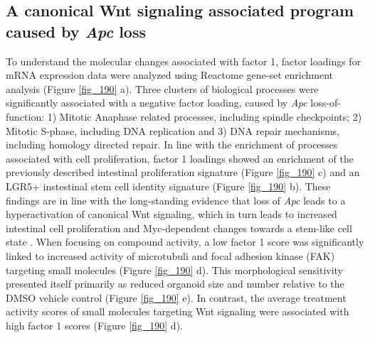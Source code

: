 \begin{flushleft}
\subsection{A canonical Wnt signaling associated program caused by \textit{Apc} loss}

To understand the molecular changes associated with factor 1, factor loadings for mRNA expression data were analyzed using Reactome gene-set enrichment analysis (Figure \ref{fig_190} a). Three clusters of biological processes were significantly associated with a negative factor loading, caused by \textit{Apc} loss-of-function: 1) Mitotic Anaphase related processes, including spindle checkpoints; 2) Mitotic S-phase, including DNA replication and 3) DNA repair mechanisms, including homology directed repair. In line with the enrichment of processes associated with cell proliferation, factor 1 loadings showed an enrichment of the previously described intestinal proliferation signature (Figure \ref{fig_190} c) and an LGR5+ instestinal stem cell identity signature (Figure \ref{fig_190} b). These findings are in line with the long-standing evidence that loss of \textit{Apc} leads to a hyperactivation of canonical Wnt signaling, which in turn leads to increased intestinal cell proliferation and Myc-dependent changes towards a stem-like cell state \citep{sansomMycDeletionRescues2007, satohGlobalMetabolicReprogramming2017}. When focusing on compound activity, a low factor 1 score was significantly linked to increased activity of microtubuli and focal adhesion kinase (FAK) targeting small molecules (Figure \ref{fig_190} d). This morphological sensitivity presented itself primarily as reduced organoid size and number relative to the DMSO vehicle control (Figure \ref{fig_190} e). In contrast, the average treatment activity scores of small molecules targeting Wnt signaling were associated with high factor 1 scores (Figure \ref{fig_190} d).  



\end{flushleft}
